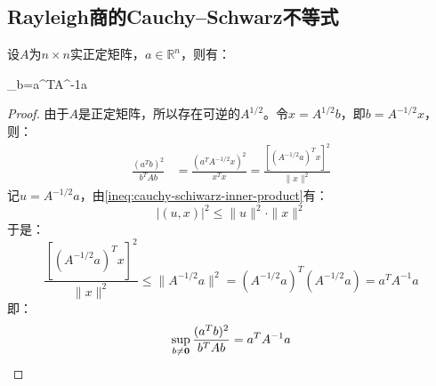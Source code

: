 \subsection{Rayleigh商的Cauchy–Schwarz不等式}
\begin{theorem}
	设$A$为$n\times n$实正定矩阵，$a\in\mathbb{R}^n$，则有：
	\begin{inequality*}\label{ineq:cauchy-schiwarz-rayleigh}
		\sup_{b\ne{}}=a^TA^{-1}a
	\end{inequality*}
\end{theorem}
\begin{proof}
	由于$A$是正定矩阵，所以存在可逆的$A^{1/2}$。令$x = A^{1/2}b$，即$b = A^{-1/2}x$，则：
	\begin{align*}
		\frac{(a^Tb)^2}{b^TAb} &= \frac{(a^T A^{-1/2} x)^2}{x^T x}=\frac{[(A^{-1/2} a)^T x]^2}{\|x\|^2}
	\end{align*}
	记$u = A^{-1/2}a$，由\cref{ineq:cauchy-schiwarz-inner-product}有：
	\begin{equation*}
		|(u,x)|^2 \leqslant \|u\|^2 \cdot \|x\|^2
	\end{equation*}
	于是：
	\begin{equation*}
		\frac{[(A^{-1/2} a)^T x]^2}{\|x\|^2} \leqslant \|A^{-1/2}a\|^2 = (A^{-1/2}a)^T (A^{-1/2}a) = a^T A^{-1} a
	\end{equation*}
	即：
	\begin{equation*}
		\sup_{b\ne\mathbf{0}}\frac{(a^Tb)^2}{b^TAb}=a^TA^{-1}a \qedhere
	\end{equation*}
\end{proof}
